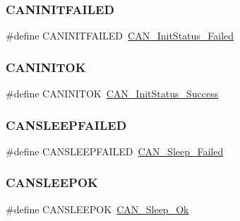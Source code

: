 \mbox{\label{group___c_a_n___legacy_ga0539a9e5a898fcd71c4dcb7e341e4b86}} 
\subsubsection{\texorpdfstring{CANINITFAILED}{CANINITFAILED}}
{\footnotesize\ttfamily \#define C\+A\+N\+I\+N\+I\+T\+F\+A\+I\+L\+ED~\mbox{\hyperlink{group___c_a_n__sleep__constants_ga095c319e8c54c974eb2b6eeadf180d96}{C\+A\+N\+\_\+\+Init\+Status\+\_\+\+Failed}}}

\mbox{\label{group___c_a_n___legacy_ga14cba0b5b506be73e2f45c732f8e54cb}} 
\subsubsection{\texorpdfstring{CANINITOK}{CANINITOK}}
{\footnotesize\ttfamily \#define C\+A\+N\+I\+N\+I\+T\+OK~\mbox{\hyperlink{group___c_a_n__sleep__constants_ga6bed5957af8f2f6b00568e15ccac5772}{C\+A\+N\+\_\+\+Init\+Status\+\_\+\+Success}}}

\mbox{\label{group___c_a_n___legacy_ga4d5e8e0c57febb024b30e5f24866a117}} 
\subsubsection{\texorpdfstring{CANSLEEPFAILED}{CANSLEEPFAILED}}
{\footnotesize\ttfamily \#define C\+A\+N\+S\+L\+E\+E\+P\+F\+A\+I\+L\+ED~\mbox{\hyperlink{group___c_a_n__sleep__constants_ga169500ab7169c4e9c7e9e4ea34b3e070}{C\+A\+N\+\_\+\+Sleep\+\_\+\+Failed}}}

\mbox{\label{group___c_a_n___legacy_ga2f8d34f8f60a6c84d8e436d4d37708ab}} 
\subsubsection{\texorpdfstring{CANSLEEPOK}{CANSLEEPOK}}
{\footnotesize\ttfamily \#define C\+A\+N\+S\+L\+E\+E\+P\+OK~\mbox{\hyperlink{group___c_a_n__sleep__constants_gaf5c4e9d32d4faff9d0bf61e153ed7998}{C\+A\+N\+\_\+\+Sleep\+\_\+\+Ok}}}

